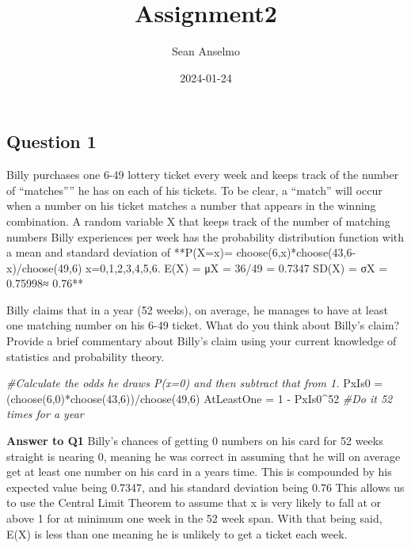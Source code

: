 \documentclass[
]{article}
\title{Assignment2}
\author{Sean Anselmo}
\date{2024-01-24}
\newenvironment{Shaded}{\begin{snugshade}}{\end{snugshade}}
\newcommand{\CommentTok}[1]{\textcolor[rgb]{0.56,0.35,0.01}{\textit{#1}}}
\newcommand{\DecValTok}[1]{\textcolor[rgb]{0.00,0.00,0.81}{#1}}
\newcommand{\FunctionTok}[1]{\textcolor[rgb]{0.00,0.00,0.00}{#1}}
\newcommand{\NormalTok}[1]{#1}
\newcommand{\OtherTok}[1]{\textcolor[rgb]{0.56,0.35,0.01}{#1}}
\newcommand{\SpecialCharTok}[1]{\textcolor[rgb]{0.00,0.00,0.00}{#1}}
\begin{document}
\maketitle

\hypertarget{question-1}{%
\subsection{Question 1}\label{question-1}}

Billy purchases one 6-49 lottery ticket every week and keeps track of
the number of ``matches'''' he has on each of his tickets. To be clear,
a ``match'' will occur when a number on his ticket matches a number that
appears in the winning combination. A random variable X that keeps track
of the number of matching numbers Billy experiences per week has the
probability distribution function with a mean and standard deviation of
**P(X=x)= choose(6,x)*choose(43,6-x)/choose(49,6)
x=0,1,2,3,4,5,6.\textbf{ }E(X) = μX = 36/49 = 0.7347\textbf{ }SD(X) = σX
= 0.75998≈ 0.76**

Billy claims that in a year (52 weeks), on average, he manages to have
at least one matching number on his 6-49 ticket. What do you think about
Billy's claim? Provide a brief commentary about Billy's claim using your
current knowledge of statistics and probability theory.

\begin{Shaded}
\begin{Highlighting}[]
\CommentTok{\#Calculate the odds he draws P(x=0) and then subtract that from 1.}
\NormalTok{PxIs0 }\OtherTok{=}\NormalTok{ (}\FunctionTok{choose}\NormalTok{(}\DecValTok{6}\NormalTok{,}\DecValTok{0}\NormalTok{)}\SpecialCharTok{*}\FunctionTok{choose}\NormalTok{(}\DecValTok{43}\NormalTok{,}\DecValTok{6}\NormalTok{))}\SpecialCharTok{/}\FunctionTok{choose}\NormalTok{(}\DecValTok{49}\NormalTok{,}\DecValTok{6}\NormalTok{)}
\NormalTok{AtLeastOne }\OtherTok{=} \DecValTok{1} \SpecialCharTok{{-}}\NormalTok{ PxIs0}\SpecialCharTok{\^{}}\DecValTok{52} \CommentTok{\#Do it 52 times for a year}
\end{Highlighting}
\end{Shaded}

\textbf{Answer to Q1} Billy's chances of getting 0 numbers on his card
for 52 weeks straight is nearing 0, meaning he was correct in assuming
that he will on average get at least one number on his card in a years
time. This is compounded by his expected value being 0.7347, and his
standard deviation being 0.76 This allows us to use the Central Limit
Theorem to assume that x is very likely to fall at or above 1 for at
minimum one week in the 52 week span. With that being said, E(X) is less
than one meaning he is unlikely to get a ticket each week.
\end{document}

